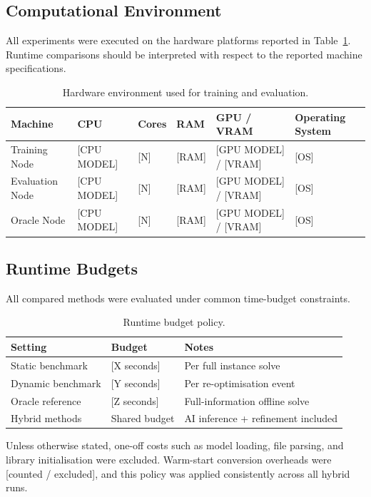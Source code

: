 \subsection{Computational Environment}

All experiments were executed on the hardware platforms reported in
Table~\ref{tab:hardware}. Runtime comparisons should be interpreted with respect
to the reported machine specifications.

\begin{table}[H]
\centering
\caption{Hardware environment used for training and evaluation.}
\label{tab:hardware}
\begin{tabular}{llllll}
\toprule
Machine & CPU & Cores & RAM & GPU / VRAM & Operating System \\
\midrule
Training Node & [CPU MODEL] & [N] & [RAM] & [GPU MODEL] / [VRAM] & [OS] \\
Evaluation Node & [CPU MODEL] & [N] & [RAM] & [GPU MODEL] / [VRAM] & [OS] \\
Oracle Node & [CPU MODEL] & [N] & [RAM] & [GPU MODEL] / [VRAM] & [OS] \\
\bottomrule
\end{tabular}
\end{table}

\subsection{Runtime Budgets}

All compared methods were evaluated under common time-budget constraints.

\begin{table}[H]
\centering
\caption{Runtime budget policy.}
\label{tab:budgets}
\begin{tabular}{lll}
\toprule
Setting & Budget & Notes \\
\midrule
Static benchmark & [X seconds] & Per full instance solve \\
Dynamic benchmark & [Y seconds] & Per re-optimisation event \\
Oracle reference & [Z seconds] & Full-information offline solve \\
Hybrid methods & Shared budget & AI inference + refinement included \\
\bottomrule
\end{tabular}
\end{table}

Unless otherwise stated, one-off costs such as model loading, file parsing, and
library initialisation were excluded. Warm-start conversion overheads were
[counted / excluded], and this policy was applied consistently across all hybrid
runs.

